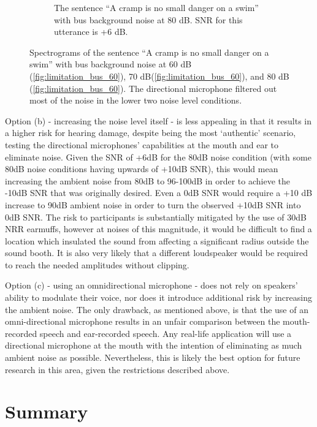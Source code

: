 \begin{figure}[h]
\begin{center}
\begin{subfigure}{0.475\textwidth}
  \caption{The sentence ``A cramp is no small danger on a swim'' with bus background noise at 80 dB. SNR for this utterance is +6 dB.}
  \label{fig:limitation_bus_80}
\end{subfigure}
\end{center}
\caption{Spectrograms of the sentence ``A cramp is no small danger on a swim'' with bus background noise at 60 dB (\ref{fig:limitation_bus_60}), 70 dB(\ref{fig:limitation_bus_60}), and 80 dB (\ref{fig:limitation_bus_60}). The directional microphone filtered out most of the noise in the lower two noise level conditions.}
\label{fig:noise_level_limitation}
\end{figure}

Option (b) - increasing the noise level itself - is less appealing in that it results in a higher risk for hearing damage, despite being the most `authentic' scenario, testing the directional microphones' capabilities at the mouth and ear to eliminate noise.  Given the SNR of +6dB for the 80dB noise condition (with some 80dB noise conditions having upwards of +10dB SNR), this would mean increasing the ambient noise from 80dB to 96-100dB in order to achieve the -10dB SNR that was originally desired.  Even a 0dB SNR would require a +10 dB increase to 90dB ambient noise in order to turn the observed +10dB SNR into 0dB SNR. The risk to participants is substantially mitigated by the use of 30dB NRR earmuffs, however at noises of this magnitude, it would be difficult to find a location which insulated the sound from affecting a significant radius outside the sound booth.  It is also very likely that a different loudspeaker would be required to reach the needed amplitudes without clipping.

Option (c) - using an omnidirectional microphone - does not rely on speakers' ability to modulate their voice, nor does it introduce additional risk by increasing the ambient noise.  The only drawback, as mentioned above, is that the use of an omni-directional microphone results in an unfair comparison between the mouth-recorded speech and ear-recorded speech.  Any real-life application will use a directional microphone at the mouth with the intention of eliminating as much ambient noise as possible.  Nevertheless, this is likely the best option for future research in this area, given the restrictions described above.

\section{Summary}\label{chap2:summary}

